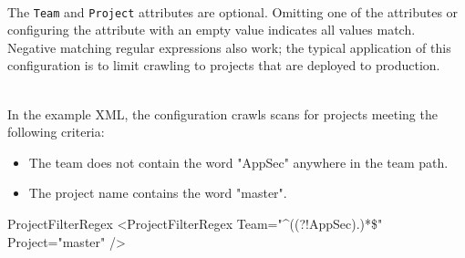 \noindent\\The \texttt{Team} and \texttt{Project} attributes are optional.  Omitting one of the attributes or configuring the attribute with an empty
value indicates all values match.  Negative matching regular expressions also work; the typical application of this configuration is to limit crawling
to projects that are deployed to production.

\noindent\\In the example XML, the configuration crawls scans for projects meeting the following criteria:

\begin{itemize}
    \item The team does not contain the word "AppSec" anywhere in the team path.
    \item The project name contains the word "master".
\end{itemize}

\begin{xml}{ProjectFilterRegex}{}{}
<ProjectFilterRegex 
    Team="^((?!AppSec).)*\$" 
    Project="master"
    />
\end{xml}
    